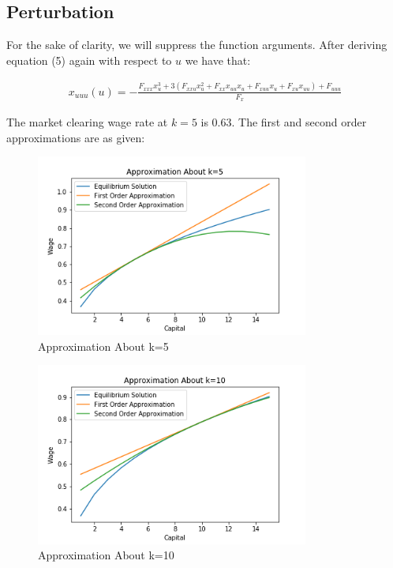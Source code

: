 \documentclass[letterpaper,11pt]{article}
\theoremstyle{definition}
\begin{document}
\begin{spacing}{1.5}
\section*{Perturbation}\label{Perturb_HW}
\setcounter{Exercise}{0}
	\begin{Exercise} \label{Perturb_HW_Cubic}
			For the sake of clarity, we will suppress the function arguments. After deriving equation (5) again with respect to $u$ we have that:

			\begin{align*}
				x_{uuu}(u) = - \frac{F_{xxx}x_u^3 + 3(F_{xxu}x_u^2+F_{xx}x_{uu}x_u+F_{xuu}x_u+F_{xu}x_{uu})+F_{uuu}}{F_x}
			\end{align*}
	\end{Exercise}

	\begin{Exercise} \label{Perturb_HW02_GEApprox}
		The market clearing wage rate at $k=5$ is $0.63$. The first and second order approximations are as given:

		\begin{figure}[H]
			\caption{Approximation About k=5}
			\label{fig:approx_5}
			\includegraphics[width=0.8\textwidth]{approx_k_5.png}
		\end{figure}

		\begin{figure}[H]
			\caption{Approximation About k=10}
			\label{fig:approx_10}
			\includegraphics[width=0.8\textwidth]{approx_k_10.png}
		\end{figure}
	\end{Exercise}


\end{spacing}
\end{document}
